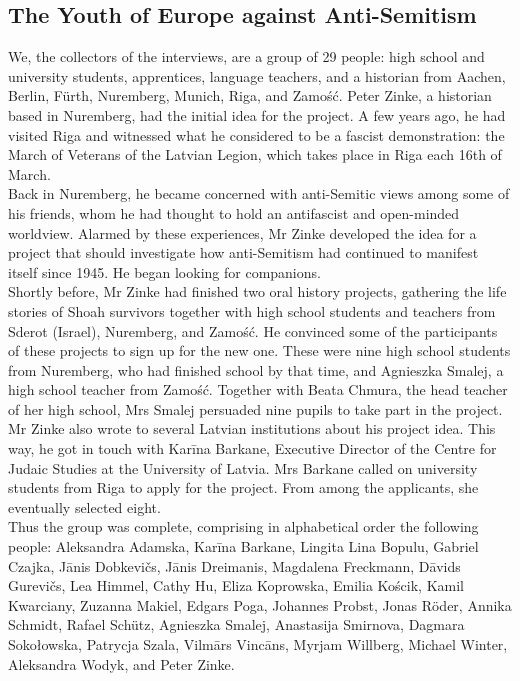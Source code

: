 \subsection*{The Youth of Europe against Anti-Semitism} 
\sloppy
We, the collectors of the interviews, are a group of 29 people: high school and university students, apprentices, language teachers, and a historian from Aachen, Berlin, Fürth, Nuremberg, Munich, Riga, and Zamość. Peter Zinke, a historian based in Nuremberg, had the initial idea for the project. A few years ago, he had visited Riga and witnessed what he considered to be a fascist demonstration: the March of Veterans of the Latvian Legion, which takes place in Riga each 16th of March.\\
Back in Nuremberg, he became concerned with anti-Semitic views among some of his friends, whom he had thought to hold an antifascist and open-minded worldview. Alarmed by these experiences, Mr Zinke developed the idea for a project that should investigate how anti-Semitism had continued to manifest itself since 1945. He began looking for companions. \\
Shortly before, Mr Zinke had finished two oral history projects, gathering the life stories of Shoah survivors together with high school students and teachers from Sderot (Israel), Nuremberg, and Zamość. He convinced some of the participants of these projects to sign up for the new one. These were nine high school students from Nuremberg, who had finished school by that time, and Agnieszka Smalej, a high school teacher from Zamość. Together with Beata Chmura, the head teacher of her high school, Mrs Smalej persuaded nine pupils to take part in the project. Mr Zinke also wrote to several Latvian institutions about his project idea. This way, he got in touch with Karīna Barkane, Executive Director of the Centre for Judaic Studies at the University of Latvia. Mrs Barkane called on university students from Riga to apply for the project. From among the applicants, she eventually selected eight.\\
\sloppy
Thus the group was complete, comprising in alphabetical order the following people: Aleksandra Adamska, Karīna Barkane, Lingita Lina Bopulu, Gabriel Czajka, Jānis Dobkevičs, Jānis Dreimanis, Magdalena Freckmann, Dāvids Gurevičs, Lea Himmel, Cathy Hu, Eliza Koprowska, Emilia Kościk, Kamil Kwarciany, Zuzanna Makiel, Edgars Poga, Johannes Probst, Jonas Röder, Annika Schmidt, Rafael Schütz, Agnieszka Smalej, Anastasija Smirnova, Dagmara Sokołowska, Patrycja Szala, Vilmārs Vincāns, Myrjam Willberg, Michael Winter, Aleksandra Wodyk, and Peter Zinke.\\
